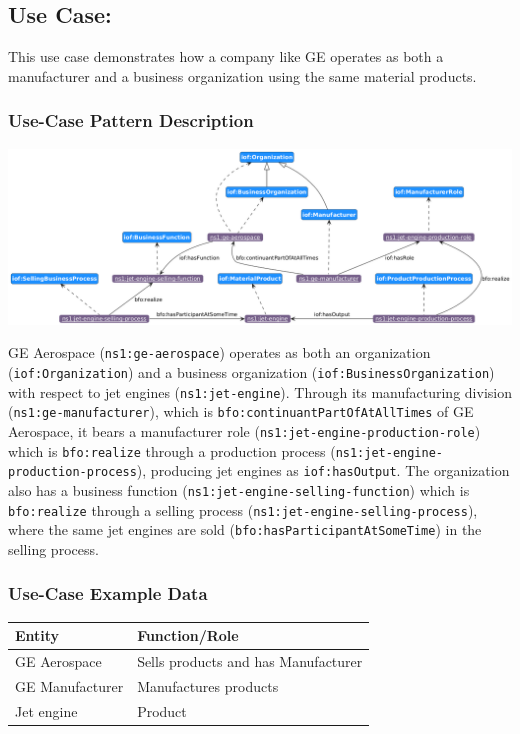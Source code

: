 \subsection*{Use Case: }

This use case demonstrates how a company like GE operates as both a manufacturer and a business organization using the same material products.

\subsubsection*{Use-Case Pattern Description}
\includegraphics[scale=0.35]{scenarios/different-type-organizations/image/different-type-organizations}

GE Aerospace (\texttt{ns1:ge-aerospace}) operates as both an organization (\texttt{iof:Organization}) and a business organization (\texttt{iof:BusinessOrganization}) with respect to jet engines (\texttt{ns1:jet-engine}). Through its manufacturing division (\texttt{ns1:ge-manufacturer}), which is \texttt{bfo:continuantPartOfAtAllTimes} of GE Aerospace, it bears a manufacturer role (\texttt{ns1:jet-engine-production-role}) which is \texttt{bfo:realize} through a production process (\texttt{ns1:jet-engine-production-process}), producing jet engines as \texttt{iof:hasOutput}. The organization also has a business function (\texttt{ns1:jet-engine-selling-function}) which is \texttt{bfo:realize} through a selling process (\texttt{ns1:jet-engine-selling-process}), where the same jet engines are sold (\texttt{bfo:hasParticipantAtSomeTime}) in the selling process.
\subsubsection*{Use-Case Example Data}


\begin{table}[h]
\label{tab:organization-structure}
\begin{tabular}{|l|l|}
\hline
Entity & Function/Role \\ \hline
GE Aerospace & Sells products and has Manufacturer \\
GE Manufacturer & Manufactures products \\
Jet engine & Product \\
\hline
\end{tabular}%
\end{table}


